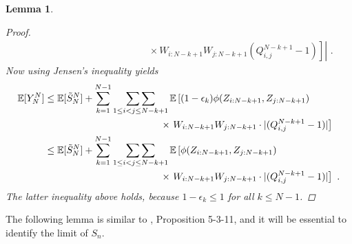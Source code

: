 \documentclass[phd]{UWMThesis}
\DeclarePairedDelimiter\abs{\lvert}{\rvert}%
\newcommand{\E}{\mathbb{E}}
\newcommand{\StN}[1]{\tilde{S}_{#1}^N}
\newcommand{\mdot}{\textrm{ .}}
\renewcommand{\.}{\textrm{ .}}
\newcommand{\doublesum}{\mathop{\sum\sum}}
\newtheorem{lemma}[thm]{Lemma}
\theoremstyle{definition}
\numberwithin{thm}{chapter}
\begin{document}
\begin{lemma}
\begin{proof}
\begin{align*}
		&\qquad\qquad\qquad\qquad\qquad\qquad \times \left.\left. W_{i:N-k+1} W_{j:N-k+1}(Q_{i,j}^{N-k+1} - 1) \right]\right|\mdot
		\end{align*}
		Now using Jensen's inequality yields
		\begin{align*}
		\E[Y_N^N] &\leq \E[\StN{N}] + \sum_{k=1}^{N-1} \doublesum\limits_{1\leq i<j\leq N-k+1}\E\left[(1-\epsilon_k) \phi(Z_{i:N-k+1}, Z_{j:N-k+1}) \right.\\
		&\qquad\qquad\qquad\qquad\qquad\qquad \times \left. W_{i:N-k+1} W_{j:N-k+1} \cdot \abs{(Q_{i,j}^{N-k+1} - 1)}\right]\\
		&\leq \E[\StN{N}] + \sum_{k=1}^{N-1} \doublesum\limits_{1\leq i<j\leq N-k+1}\E\left[\phi(Z_{i:N-k+1}, Z_{j:N-k+1}) \right. \\
		&\qquad\qquad\qquad\qquad\qquad\qquad \times \left. W_{i:N-k+1} W_{j:N-k+1} \cdot \abs{(Q_{i,j}^{N-k+1} - 1)}\right]\mdot
		\end{align*}
		The latter inequality above holds, because $1-\epsilon_k \leq 1$ for all $k\leq N-1$. 
	\end{proof}
\end{lemma}
%
The following lemma is similar to \cite{neveu1975discrete}, Proposition 5-3-11, and it will be essential to identify the limit of $S_n$.
\end{document}
